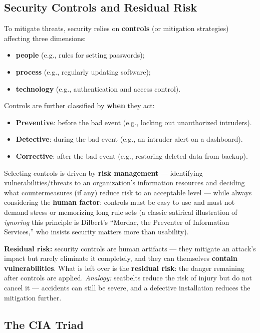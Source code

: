 \documentclass[12pt, a4paper]{article}
\begin{document}
\subsection{Security Controls and Residual Risk}

To mitigate threats, security relies on \textbf{controls} (or mitigation strategies) affecting three dimensions:
\begin{itemize}
    \item \textbf{people} (e.g., rules for setting passwords);
    \item \textbf{process} (e.g., regularly updating software);
    \item \textbf{technology} (e.g., authentication and access control).
\end{itemize}

Controls are further classified by \textbf{when} they act:
\begin{itemize}
    \item \textbf{Preventive}: before the bad event (e.g., locking out unauthorized intruders).
    \item \textbf{Detective}: during the bad event (e.g., an intruder alert on a dashboard).
    \item \textbf{Corrective}: after the bad event (e.g., restoring deleted data from backup).
\end{itemize}

Selecting controls is driven by \textbf{risk management} — identifying vulnerabilities/threats to an organization's information resources and deciding what countermeasures (if any) reduce risk to an acceptable level — while always considering the \textbf{human factor}: controls must be easy to use and must not demand stress or memorizing long rule sets (a classic satirical illustration of \emph{ignoring} this principle is Dilbert's ``Mordac, the Preventer of Information Services,'' who insists security matters more than usability).

\textcolor{red!70!black}{\textbf{Residual risk:}} security controls are human artifacts — they mitigate an attack's impact but rarely eliminate it completely, and they can themselves \textbf{contain vulnerabilities}. What is left over is the \textbf{residual risk}: the danger remaining after controls are applied. \emph{Analogy:} seatbelts reduce the risk of injury but do not cancel it — accidents can still be severe, and a defective installation reduces the mitigation further.

\subsection{The CIA Triad}
\label{subsec:cia-01}
\end{document}
